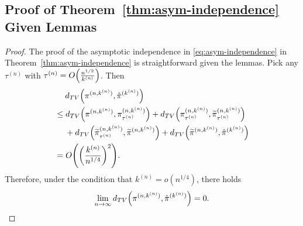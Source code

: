 \documentclass[sigconf]{acmart}
\newcommand{\supn}{^{(n)}}
\begin{document}
\subsection{Proof of Theorem~\ref{thm:asym-independence} Given Lemmas}
\begin{proof}
The proof of the asymptotic independence in \eqref{eq:asym-independence} in Theorem~\ref{thm:asym-independence} is straightforward given the lemmas.  Pick any $\tau\supn$ with $\tau\supn=O\Bigl(\frac{n^{1/2}}{k\supn}\Bigr)$.  Then
\begin{align*}
&\mspace{23mu}d_{TV}\Bigl(\pi^{(n,k\supn)},\hat{\pi}^{(k\supn)}\Bigr)\\
&\le d_{TV}\Bigl(\pi^{(n,k\supn)},\pi_{\tau\supn}^{(n,k\supn)}\Bigr)+d_{TV}\Bigl(\pi_{\tau\supn}^{(n,k\supn)},\widetilde{\pi}_{\tau\supn}^{(n,k\supn)}\Bigr)\\
&\mspace{23mu}+d_{TV}\Bigl(\widetilde{\pi}_{\tau\supn}^{(n,k\supn)},\widetilde{\pi}^{(n,k\supn)}\Bigr)+d_{TV}\Bigl(\widetilde{\pi}^{(n,k\supn)},\hat{\pi}^{(k\supn)}\Bigr)\\
&=O\Biggl(\biggl(\frac{k\supn}{n^{1/4}}\biggr)^2\Biggr).
\end{align*}
Therefore, under the condition that $k\supn=o(n^{1/4})$, there holds
\begin{equation*}
\lim_{n\to\infty}d_{TV}\Bigl(\pi^{(n,k\supn)},\hat{\pi}^{(k\supn)}\Bigr)=0.
\end{equation*}


\end{proof}
\end{document}
